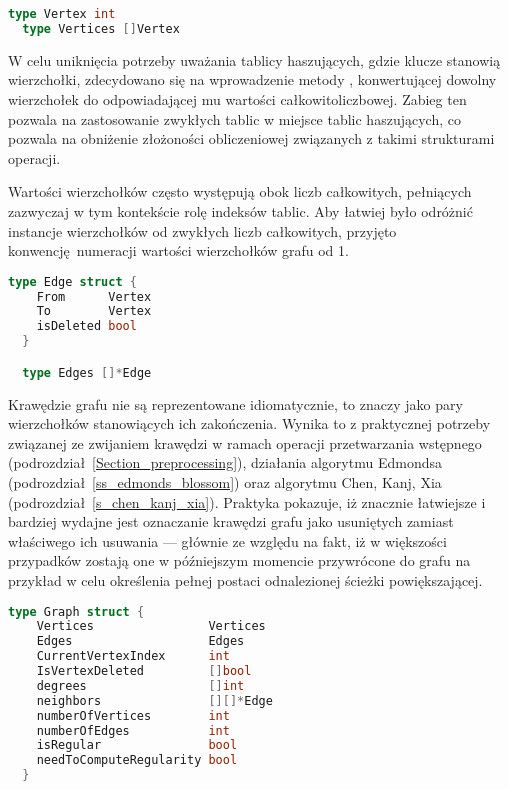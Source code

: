 \par{
  \begin{lstlisting}[language=go, caption=Typy reprezentujące wierzchołki grafu.]
  type Vertex int
  type Vertices []Vertex
  \end{lstlisting}
  W celu uniknięcia potrzeby uważania tablicy haszujących, gdzie klucze stanowią wierzchołki, zdecydowano się na wprowadzenie metody , konwertującej dowolny wierzchołek do odpowiadającej mu wartości całkowitoliczbowej.
  Zabieg ten pozwala na zastosowanie zwykłych tablic w miejsce tablic haszujących, co pozwala na obniżenie złożoności obliczeniowej związanych z takimi strukturami operacji.

  Wartości wierzchołków często występują obok liczb całkowitych, pełniących zazwyczaj w tym kontekście rolę indeksów tablic.
  Aby łatwiej było odróżnić instancje wierzchołków od zwykłych liczb całkowitych, przyjęto konwencję numeracji wartości wierzchołków grafu od 1.
  \begin{lstlisting}[language=go, caption=Typy reprezentujące krawędzie grafu.]
  type Edge struct {
    From      Vertex
    To        Vertex
    isDeleted bool
  }

  type Edges []*Edge
  \end{lstlisting}

  Krawędzie grafu nie są reprezentowane idiomatycznie, to znaczy jako pary wierzchołków stanowiących ich zakończenia.
  Wynika to z praktycznej potrzeby związanej ze zwijaniem krawędzi w ramach operacji przetwarzania wstępnego (podrozdział~\ref{Section_preprocessing}), działania algorytmu Edmondsa (podrozdział~\ref{ss_edmonds_blossom}) oraz algorytmu Chen, Kanj, Xia (podrozdział~\ref{s_chen_kanj_xia}).
  Praktyka pokazuje, iż znacznie łatwiejsze i bardziej wydajne jest oznaczanie krawędzi grafu jako usuniętych zamiast właściwego ich usuwania --- głównie ze względu na fakt, iż w większości przypadków zostają one w późniejszym momencie przywrócone do grafu na przykład w celu określenia pełnej postaci odnalezionej ścieżki powiększającej.

  \begin{lstlisting}[language=go, caption=Struktura reprezentująca graf.]
  type Graph struct {
    Vertices                Vertices
    Edges                   Edges
    CurrentVertexIndex      int
    IsVertexDeleted         []bool
    degrees                 []int
    neighbors               [][]*Edge
    numberOfVertices        int
    numberOfEdges           int
    isRegular               bool
    needToComputeRegularity bool
  }
  \end{lstlisting}

}
